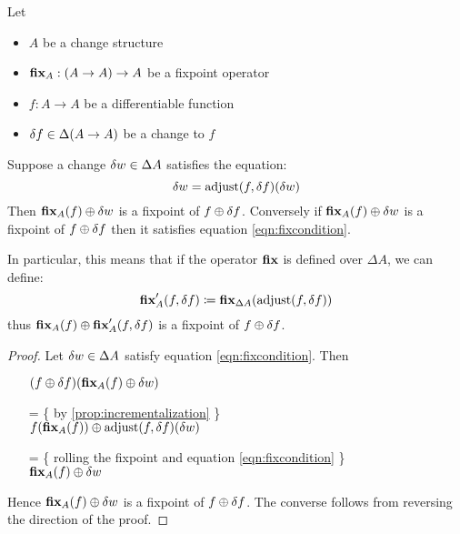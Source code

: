 \begin{thm}
\label{thm:fixpointDiff}
  Let 
  \begin{itemize}
    \item $A$ be a change structure
    \item$\textbf{fix}_A : (A \rightarrow A) \rightarrow A$ be a fixpoint operator
    \item $f: A \rightarrow A$ be a differentiable function
    \item $\delta f \in \Delta (A \rightarrow A)$ be a change to $f$
  \end{itemize}

  Suppose a change $\delta w \in \Delta A$ satisfies
  the equation:
  \begin{equation}\label{eqn:fixcondition}
    \delta w = \operatorname{adjust}(f, \delta f)(\delta w)
  \end{equation}
  Then $\textbf{fix}_A(f) \oplus \delta w$ is a fixpoint of $f \oplus \delta f$. Conversely
  if $\textbf{fix}_A(f) \oplus \delta w$ is a fixpoint of $f \oplus \delta f$ then
  it satisfies equation \ref{eqn:fixcondition}.
  
  In particular, this means that 
  if the operator $\textbf{fix}$ is defined over $\Delta A$, we can define:
  $$
  \textbf{fix}_A'(f, \delta f) \coloneqq
  \textbf{fix}_{\Delta A}(\operatorname{adjust}(f, \delta f))
  $$
  thus $\textbf{fix}_A(f) \oplus \textbf{fix}_A'(f, \delta f)$ is a fixpoint 
  of $f \oplus \delta f$.
\end{thm}
\begin{proof}
  Let $\delta w \in \Delta A$ satisfy equation \ref{eqn:fixcondition}. Then
  \begin{itemize}
  \item[ ]
    $
    (f \oplus \delta f)(\textbf{fix}_A(f) \oplus \delta w)
    $
  \item[=]\{ by \ref{prop:incrementalization} \}\\
    $
    f(\textbf{fix}_A(f))
    \oplus
    \operatorname{adjust}(f, \delta f)(\delta w)
    $
  \item[=]\{ rolling the fixpoint and equation \ref{eqn:fixcondition} \}\\
    $
    \textbf{fix}_A(f)
    \oplus
    \delta w
    $
  \end{itemize}
  Hence $\textbf{fix}_A(f) \oplus \delta w$ is a fixpoint of $f \oplus \delta f$. The converse
  follows from reversing the direction of the proof.
\end{proof}

